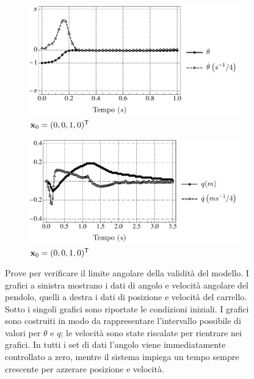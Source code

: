 \begin{figure}
    \centering
    \begin{subfigure}[t]{0.48\textwidth}
        \centering
        \includegraphics[width=\textwidth]{assets/theta-limit-angle1}
        \caption{$\mathbf{x}_0 = (0, 0, 1, 0)^{\mathsf{T}}$}
    \end{subfigure}
    \hfill
    \begin{subfigure}[t]{0.48\textwidth}
        \centering
        \includegraphics[width=\textwidth]{assets/theta-limit-pos1}
        \caption{$\mathbf{x}_0 = (0, 0, 1, 0)^{\mathsf{T}}$}
    \end{subfigure}


    \caption[Limite della validità della linearizzazione]{
        Prove per verificare il limite angolare
        della validità del modello.
        I grafici a sinistra mostrano i dati di angolo e velocità angolare del pendolo,
        quelli a destra i dati di posizione e velocità del carrello.
        Sotto i singoli grafici sono
        riportate le condizioni iniziali.
        I grafici sono costruiti in modo da rappresentare l'intervallo
        possibile di valori per $\theta$ e $q$; le velocità sono
        state riscalate per rientrare nei grafici.
        In tutti i set di dati l'angolo viene immediatamente controllato
        a zero, mentre il sistema impiega un tempo sempre crescente
        per azzerare posizione e velocità.
    }
    \label{fig:real-theta-limit}
\end{figure}


